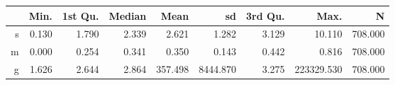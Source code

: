 \begin{table}[ht]
\centering
\begin{tabular}{rrrrrrrrr}
  \hline
 & Min. & 1st Qu. & Median & Mean & sd & 3rd Qu. & Max. & N \\ 
  \hline
s & 0.130 & 1.790 & 2.339 & 2.621 & 1.282 & 3.129 & 10.110 & 708.000 \\ 
  m & 0.000 & 0.254 & 0.341 & 0.350 & 0.143 & 0.442 & 0.816 & 708.000 \\ 
  g & 1.626 & 2.644 & 2.864 & 357.498 & 8444.870 & 3.275 & 223329.530 & 708.000 \\ 
   \hline
\end{tabular}
\end{table}
